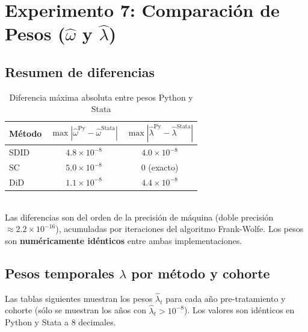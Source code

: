 
\newpage
\section{Experimento 7: Comparaci\'on de Pesos ($\hat{\omega}$ y $\hat{\lambda}$)}

\subsection*{Resumen de diferencias}

\begin{table}[H]
\centering
\caption{Diferencia m\'axima absoluta entre pesos Python y Stata}
\label{tab:weight_summary}
\begin{tabular}{lcc}
\toprule
M\'etodo & $\max|\hat{\omega}^{\text{Py}} - \hat{\omega}^{\text{Stata}}|$ &
           $\max|\hat{\lambda}^{\text{Py}} - \hat{\lambda}^{\text{Stata}}|$ \\
\midrule
SDID & $4{.}8 \times 10^{-8}$ & $4{.}0 \times 10^{-8}$ \\
SC   & $5{.}0 \times 10^{-8}$ & $0$ (exacto) \\
DiD  & $1{.}1 \times 10^{-8}$ & $4{.}4 \times 10^{-8}$ \\
\bottomrule
\end{tabular}\\[0.4em]
{\small Las diferencias son del orden de la precisi\'on de m\'aquina (doble precisi\'on $\approx 2{.}2\times10^{-16}$),
acumuladas por iteraciones del algoritmo Frank-Wolfe. Los pesos son \textbf{num\'ericamente id\'enticos} entre ambas implementaciones.}
\end{table}

\subsection*{Pesos temporales $\hat{\lambda}$ por m\'etodo y cohorte}

Las tablas siguientes muestran los pesos $\hat{\lambda}_t$ para cada a\~no pre-tratamiento
y cohorte (s\'olo se muestran los a\~nos con $\hat{\lambda}_t > 10^{-8}$).
Los valores son id\'enticos en Python y Stata a 8 decimales.



